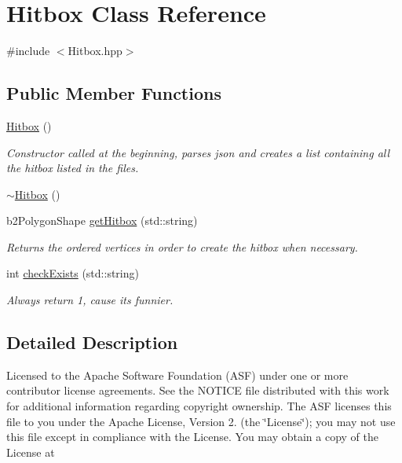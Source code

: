 \hypertarget{class_hitbox}{\section{Hitbox Class Reference}
\label{class_hitbox}
}


{\ttfamily \#include $<$Hitbox.\-hpp$>$}

\subsection*{Public Member Functions}
\begin{DoxyCompactItemize}
\item 
\hyperlink{class_hitbox_a999b0be8486978b3dd7bcd001c7c3c03}{Hitbox} ()
\begin{DoxyCompactList}\small\item\em Constructor called at the beginning, parses json and creates a list containing all the hitbox listed in the files. \end{DoxyCompactList}\item 
\hyperlink{class_hitbox_aafd01dbe871f6f7f464217345bd4ca01}{$\sim$\-Hitbox} ()
\item 
b2\-Polygon\-Shape \hyperlink{class_hitbox_a2f5b5e9940cc0918e58dfbfb62a493bb}{get\-Hitbox} (std\-::string)
\begin{DoxyCompactList}\small\item\em Returns the ordered vertices in order to create the hitbox when necessary. \end{DoxyCompactList}\item 
int \hyperlink{class_hitbox_ae1b89c84071782c72ee6feb56c109c59}{check\-Exists} (std\-::string)
\begin{DoxyCompactList}\small\item\em Always return 1, cause its funnier. \end{DoxyCompactList}\end{DoxyCompactItemize}


\subsection{Detailed Description}
Licensed to the Apache Software Foundation (A\-S\-F) under one or more contributor license agreements. See the N\-O\-T\-I\-C\-E file distributed with this work for additional information regarding copyright ownership. The A\-S\-F licenses this file to you under the Apache License, Version 2. (the \char`\"{}\-License\char`\"{}); you may not use this file except in compliance with the License. You may obtain a copy of the License at

